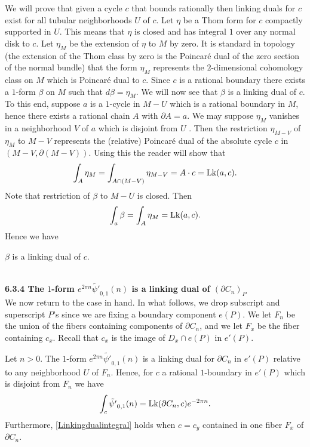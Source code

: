 

We will prove that given a cycle $c$ that bounds rationally then linking duals for $c$  exist for all tubular neighborhoods $U$ of $c$.  Let $\eta$ be a Thom form for $c$
compactly supported in $U$. This means that $\eta$ is closed and has integral $1$ over any normal disk to $c$. Let $\eta_M$ be the extension of $\eta$ to $M$ by zero.  It is standard in topology (the extension of the Thom class by zero is the Poincar\'e dual of the zero section of the normal bundle) that the form  $\eta_M$ represents the $2$-dimensional cohomology class on $M$ which is Poincar\'e dual to $c$. Since $c$ is a rational boundary there exists a $1$-form $\beta$ on $M$ such that $d \beta = \eta_M$. We will now see that $\beta$ is a linking dual of $c$.  To this end,  suppose  $a$ is a $1$-cycle in $M -U$ which is a rational boundary in $M$, hence there exists a rational
chain $A$ with $\partial A = a$.  We may suppose $\eta_M$ vanishes in a neighborhood $V$ of $a$ which is disjoint from $U$ .  Then the restriction $\eta_{M-V}$ of $\eta_M$ to $M-V$ represents the (relative) Poincar\'e dual of the absolute cycle $c$ in $(M-V, \partial (M-V))$. Using this
the reader will show that
\begin{equation*} \label{firstequation}
 \int_A \eta_M = \int_{A \cap (M-V)} \eta_{M-V}  = A \cdot c = \operatorname{Lk}(a,c).
\end{equation*}
 Note that restriction of $\beta$ to $M-U$ is closed. Then
\[
\int_a \beta  = \int_A \eta_M = \operatorname{Lk}(a,c).
\]
Hence we have 
\begin{proposition} \label{linkingdualprop}
$\beta$ is a linking dual of $c$. 
\end{proposition}
\ \\[12pt] 
\textbf{6.3.4 The $1$-form $e^{2 \pi n} \tilde{\psi'}_{0,1}(n)$ is a linking dual of $(\partial C_n)_P$} 
\\[10pt]
We now return to the case in hand. In what follows, we drop subscript and superscript $P$'s since we are fixing a boundary component $e(P)$.
We let $F_n$ be the union of the fibers containing components of $\partial C_n$, and we let $F_x$ be the fiber containing $c_x$. Recall that $c_x$ is the image of $D_x \cap e(P)$ in $e'(P)$. 

\begin{theorem}\label{linking-dual}
Let $n>0$. The $1$-form $e^{2 \pi n} \tilde{\psi'}_{0,1}(n)$ is a linking dual for $\partial C_n$ in $e'(P)$ relative to any neighborhood
$U$ of $F_n$.  Hence, for $c$ a rational $1$-boundary in $e'(P)$ which is disjoint from $F_n$ we have
\begin{equation}\label{Linkingdualintegral}
\int_c  \tilde{\psi'}_{0,1}(n) =  \operatorname{Lk}(\partial C_n,c) e^{- 2 \pi n}. 
\end{equation}
Furthermore, \eqref{Linkingdualintegral} holds when $c=c_y$ contained in one fiber $F_x$ of $\partial C_n$.
\end{theorem}

